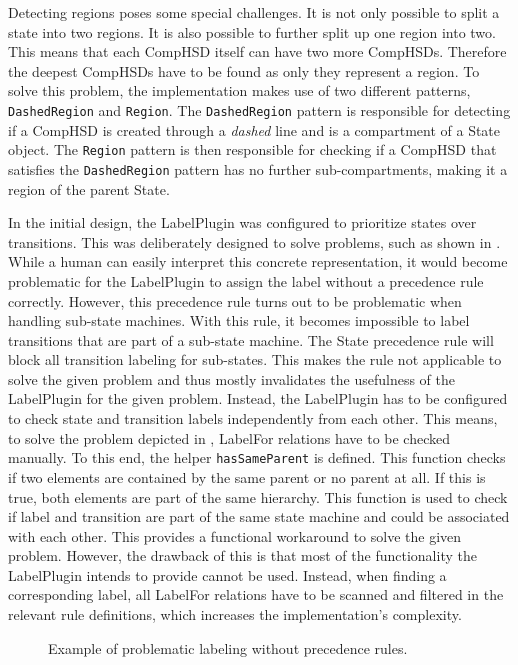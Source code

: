 
Detecting regions poses some special challenges. It is not only possible to split a state into two regions. It is also possible to further split up one region into two. This means that each CompHSD itself can have two more CompHSDs. Therefore the deepest CompHSDs have to be found as only they represent a region. To solve this problem, the implementation makes use of two different patterns, \texttt{DashedRegion} and \texttt{Region}. The \texttt{DashedRegion} pattern is responsible for detecting if a CompHSD is created through a \emph{dashed} line and is a compartment of a State object. The \texttt{Region} pattern is then responsible for checking if a CompHSD that satisfies the \texttt{DashedRegion} pattern has no further sub-compartments, making it a region of the parent State.

In the initial design, the LabelPlugin was configured to prioritize states over transitions. This was deliberately designed to solve problems, such as shown in . While a human can easily interpret this concrete representation, it would become problematic for the LabelPlugin to assign the label without a precedence rule correctly. However, this precedence rule turns out to be problematic when handling sub-state machines. With this rule, it becomes impossible to label transitions that are part of a sub-state machine. The State precedence rule will block all transition labeling for sub-states. This makes the rule not applicable to solve the given problem and thus mostly invalidates the usefulness of the LabelPlugin for the given problem. Instead, the LabelPlugin has to be configured to check state and transition labels independently from each other. This means, to solve the problem depicted in , LabelFor relations have to be checked manually. To this end, the helper \texttt{hasSameParent} is defined. This function checks if two elements are contained by the same parent or no parent at all. If this is true, both elements are part of the same hierarchy. This function is used to check if label and transition are part of the same state machine and could be associated with each other. This provides a functional workaround to solve the given problem. However, the drawback of this is that most of the functionality the LabelPlugin intends to provide cannot be used. Instead, when finding a corresponding label, all LabelFor relations have to be scanned and filtered in the relevant rule definitions, which increases the implementation’s complexity.  

\begin{figure}
\centering

\caption{Example of problematic labeling without precedence rules.}
\label{fig:close-enough}
\end{figure}

